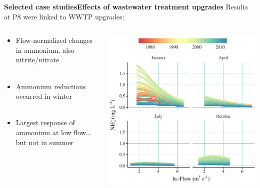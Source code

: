 \documentclass[serif]{beamer}\usepackage[]{graphicx}\usepackage[]{color}
\begin{document}
\begin{frame}{\textbf{Selected case studies}}{\textbf{Effects of wastewater treatment upgrades}}
Results at P8 were linked to WWTP upgrades:
\begin{columns}
\begin{column}{0.45\textwidth}
\begin{itemize}
\item Flow-normalized changes in ammonium, also nitrite/nitrate \\~\\
\item Ammonium reductions occurred in winter \\~\\
\item Largest response of ammonium at low flow... but not in summer
\end{itemize}
\end{column}
\begin{column}{0.4\textwidth}
\vspace{0.3in}
\centerline{\includegraphics[width = \textwidth]{fig/p8dyna_thumb.pdf}}
\end{column}
\end{columns}
\end{frame}
\end{document}
